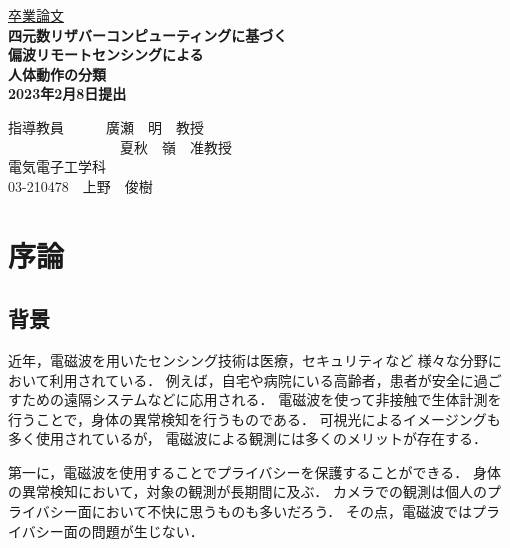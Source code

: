 \documentclass[uplatex,a4paper]{jsarticle}
\begin{document}
\begin{center}
\vspace*{3cm} \underline{\HUGE 卒業論文 }\\
\vspace{1cm}
\fontsize{24truept}{25truept}\selectfont
\bf{四元数リザバーコンピューティングに基づく\\ \vspace{5mm}
偏波リモートセンシングによる\\ \vspace{5mm}
人体動作の分類\\}
\vspace{3cm}
\huge 2023年2月8日提出 \\
\vspace{3cm}
\end{center}
\begin{minipage}{0.4\hsize}
\hspace{1zw}
\end{minipage}
\begin{center}
\begin{minipage}{0.7\hsize}
{\huge 指導教員　　　廣瀬　明　教授\\　　　　　　　\ \ 夏秋　嶺　准教授}
\vspace{1cm}\\
\centering
{\huge 電気電子工学科\\}
{\huge 03-210478　上野　俊樹}
\end{minipage}
\end{center}


\newpage
\tableofcontents

\newpage 

\section{序論}
\subsection{背景}
近年，電磁波を用いたセンシング技術は医療，セキュリティなど
様々な分野において利用されている\cite{human_motion}．
例えば，自宅や病院にいる高齢者，患者が安全に過ごすための遠隔システムなどに応用される．
電磁波を使って非接触で生体計測を行うことで，身体の異常検知を行うものである．
可視光によるイメージングも多く使用されているが，
電磁波による観測には多くのメリットが存在する．

第一に，電磁波を使用することでプライバシーを保護することができる．
身体の異常検知において，対象の観測が長期間に及ぶ．
カメラでの観測は個人のプライバシー面において不快に思うものも多いだろう．
その点，電磁波ではプライバシー面の問題が生じない．
\end{document}
